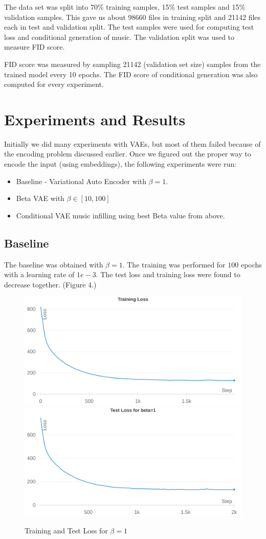 \documentclass{article}
\begin{document}
The data set was split into 70\% training samples, 15\% test samples and 15\% validation samples. This gave us about 98660 files in training split and 21142 files each in test and validation split. The test samples were used for computing test loss and conditional generation of music. The validation split was used to measure FID score.

FID score was measured by sampling 21142 (validation set size) samples from the trained model every 10 epochs. The FID score of conditional generation was also computed for every experiment.

\section{Experiments and Results}

Initially we did many experiments with VAEs, but most of them failed because of the encoding problem discussed earlier. Once we figured out the proper way to encode the input (using embeddings), the following experiments were run:

\begin{itemize}
\item Baseline - Variational Auto Encoder with $\beta = 1$.
\item Beta VAE with $\beta \in [10, 100]$
\item Conditional VAE music infilling using best Beta value from above.
\end{itemize}

\subsection{Baseline}

The baseline was obtained with $\beta = 1$. The training was performed for $100$ epochs with a learning rate of $1e-3$. The test loss and training loss were found to decrease together. (Figure 4.) 
\begin{figure}[h]
\begin{center}
\includegraphics[width=0.4\linewidth]{training_loss_beta_1.png}
\includegraphics[width=0.4\linewidth]{test_loss_beta_1.png}
\end{center}
\caption{Training and Test Loss for $\beta = 1$}
\end{figure}
\end{document}

